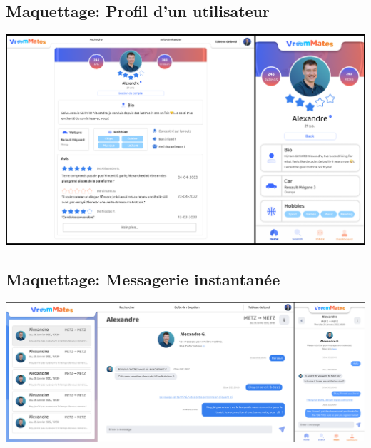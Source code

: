 \begin{landscape}
\section{Maquettage: Profil d'un utilisateur}
\label{Maquettage: Profil d'un utilisateur}
\begin{center}
\includegraphics[scale=0.5]{medias/profil.png}
\end{center}
\end{landscape}

\begin{landscape}
\section{Maquettage: Messagerie instantanée}
\label{Maquettage: Messagerie instantanée}
\begin{center}
\includegraphics[width=\linewidth]{medias/chat.png}
\end{center}
\end{landscape}
